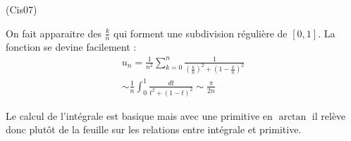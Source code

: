 \begin{tiny}(Cis07)\end{tiny} On fait apparaitre des $\frac{k}{n}$ qui forment une subdivision régulière de $[0,1]$. La fonction se devine facilement :
\begin{multline*}
 u_n
=\frac{1}{n^2}\sum_{k=0}^n \frac{1}{(\frac{k}{n})^2+(1-\frac{k}{n})^2}\\
\sim \frac{1}{n}\int_0^1\frac{dt}{t^2+(1-t)^2}
\sim \frac{\pi}{2n}
\end{multline*}

Le calcul de l'intégrale est basique mais avec une primitive en $\arctan$ il relève donc plutôt de la feuille sur les relations entre intégrale et primitive.
